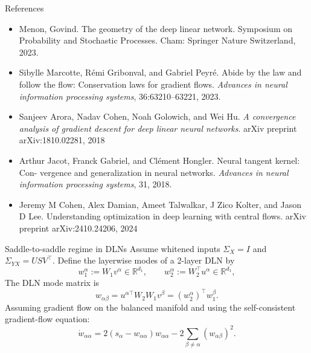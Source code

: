 \documentclass[aspectratio=169,11pt]{beamer}
\begin{document}
\begin{frame}{References}
    \begin{itemize}
        \item Menon, Govind. The geometry of the deep linear network. Symposium on Probability and Stochastic Processes. Cham: Springer Nature Switzerland, 2023.
        \item Sibylle Marcotte, R\'emi Gribonval, and Gabriel Peyr\'e. Abide by the law and
follow the flow: Conservation laws for gradient flows. \textit{Advances in neural
information processing systems}, 36:63210–63221, 2023.
    \item Sanjeev Arora, Nadav Cohen, Noah Golowich, and Wei Hu. \textit{A convergence
analysis of gradient descent for deep linear neural networks}. arXiv preprint
arXiv:1810.02281, 2018
    \item Arthur Jacot, Franck Gabriel, and Cl\'ement Hongler. Neural tangent kernel: Con-
    vergence and generalization in neural networks. \textit{Advances in neural information
    processing systems}, 31, 2018.
    \item Jeremy M Cohen, Alex Damian, Ameet Talwalkar, J Zico Kolter, and Jason D
    Lee. Understanding optimization in deep learning with central flows. arXiv
    preprint arXiv:2410.24206, 2024
    \end{itemize}
\end{frame}
\begin{frame}{Saddle-to-saddle regime in DLNs}
Assume whitened inputs $\Sigma_X = I$ and $\Sigma_{YX} = U S V^{\top}$. Define the layerwise modes of a 2-layer DLN by
\begin{equation*}
    w_1^{\alpha} := W_1 v^{\alpha} \in \mathbb{R}^{d_1}, 
    \qquad
    w_2^{\alpha} := W_2^{\top} u^{\alpha} \in \mathbb{R}^{d_1},
\end{equation*}
The DLN mode matrix is
\begin{equation*}
    w_{\alpha\beta}=u^{\alpha\top} W_2 W_1 v^{\beta} = (w_2^{\alpha})^{\top} w_1^{\beta}.
\end{equation*}
Assuming gradient flow on the balanced manifold and using the self-consistent gradient-flow equation:
\begin{equation*}
    \dot{w}_{\alpha\alpha} = 2\left(s_{\alpha} - w_{\alpha\alpha}\right)w_{\alpha\alpha}
    - 2\sum_{\beta\neq\alpha} \left(w_{\alpha\beta}\right)^2 .
\end{equation*}
\end{frame}
\end{document}

